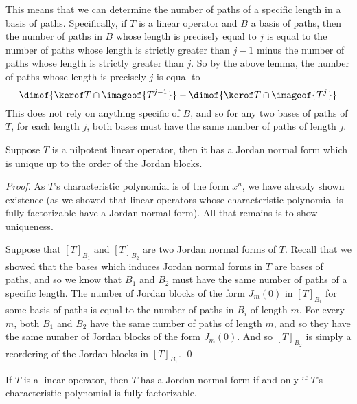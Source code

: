 This means that we can determine the number of paths of a specific length in a basis of paths.
Specifically, if $T$ is a linear operator and $B$ a basis of paths, then the number of paths in $B$ whose length is precisely equal to $j$ is equal to the number of paths whose length is strictly greater
than $j-1$ minus the number of paths whose length is strictly greater than $j$.
So by the above lemma, the number of paths whose length is precisely $j$ is equal to
\[ \dimof{\kerof T\cap\imageof{T^{j-1}}} - \dimof{\kerof T\cap\imageof{T^j}} \]
This does not rely on anything specific of $B$, and so for any two bases of paths of $T$, for each length $j$, both bases must have the same number of paths of length $j$.

\begin{thrm*}

    Suppose $T$ is a nilpotent linear operator, then it has a Jordan normal form which is unique up to the order of the Jordan blocks.

\end{thrm*}

\begin{proof}

    As $T$'s characteristic polynomial is of the form $x^n$, we have already shown existence (as we showed that linear operators whose characteristic polynomial is fully factorizable have a Jordan normal
    form).
    All that remains is to show uniqueness.

    Suppose that $[T]_{B_1}$ and $[T]_{B_2}$ are two Jordan normal forms of $T$.
    Recall that we showed that the bases which induces Jordan normal forms in $T$ are bases of paths, and so we know that $B_1$ and $B_2$ must have the same number of paths of a specific length.
    The number of Jordan blocks of the form $J_m(0)$ in $[T]_{B_i}$ for some basis of paths is equal to the number of paths in $B_i$ of length $m$.
    For every $m$, both $B_1$ and $B_2$ have the same number of paths of length $m$, and so they have the same number of Jordan blocks of the form $J_m(0)$.
    And so $[T]_{B_2}$ is simply a reordering of the Jordan blocks in $[T]_{B_1}$.
    \qed

\end{proof}

\begin{thrm*}

    If $T$ is a linear operator, then $T$ has a Jordan normal form if and only if $T$'s characteristic polynomial is fully factorizable.

\end{thrm*}

